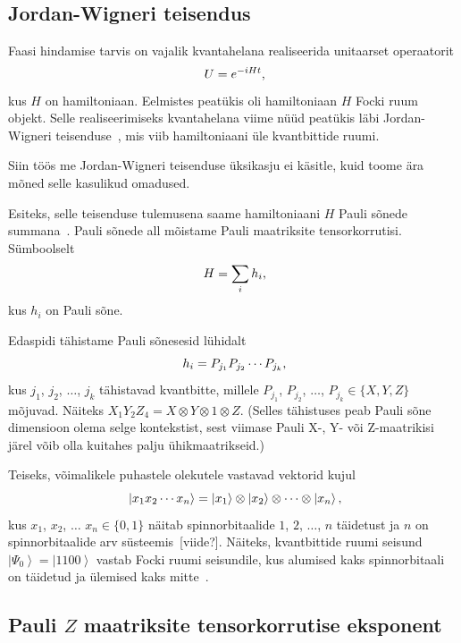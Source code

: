 \documentclass[12pt]{report}
\def\ket#1{\left|#1\right>}
\begin{document}
\subsection{Jordan-Wigneri teisendus}\label{sec:jw}

Faasi hindamise tarvis on vajalik kvantahelana realiseerida unitaarset operaatorit
\begin{equation}\label{eq:hamtime}
  U = e^{-iHt}\rlap{,}
\end{equation}
kus \(H\) on hamiltoniaan.
Eelmistes peatükis oli hamiltoniaan \(H\) Focki ruum objekt.
Selle realiseerimiseks kvantahelana viime nüüd peatükis läbi Jordan-Wigneri teisenduse~\cite{jordan+wigner}, mis viib hamiltoniaani üle kvantbittide ruumi.

Siin töös me Jordan-Wigneri teisenduse üksikasju ei käsitle, kuid toome ära mõned selle kasulikud omadused.

Esiteks, selle teisenduse tulemusena saame hamiltoniaani \(H\) Pauli sõnede summana~\cite{whitfield+etal}.
Pauli sõnede all mõistame Pauli maatriksite tensorkorrutisi.
Sümboolselt
\begin{equation}\label{eq:paulisum} H = \sum_i h_i\rlap{,} \end{equation}
kus $h_i$ on Pauli sõne.

Edaspidi tähistame Pauli sõnesesid lühidalt
\begin{equation} h_i=P_{j_1}P_{j_2}\cdots P_{j_k} \rlap{,}\end{equation}
kus \(j_1\), \(j_2\), $\ldots$, \(j_k\) tähistavad kvantbitte, millele \(P_{j_1}\), \(P_{j_2}\), \(\ldots\), \(P_{j_k}\in\{X,Y,Z\}\) mõjuvad.
Näiteks \(X_1Y_2Z_4=X\otimes Y\otimes 1\otimes Z.\)
(Selles tähistuses peab Pauli sõne dimensioon olema selge kontekstist, sest viimase Pauli X-, Y- või Z-maatrikisi järel võib olla kuitahes palju ühikmaatrikseid.)

Teiseks, võimalikele puhastele olekutele vastavad vektorid kujul
\begin{equation}
  \ket{x_1x_2\cdots x_n}
     = \ket{x_1}\otimes\ket{x_2}\otimes\cdots\otimes\ket{x_n}\rlap{,}
\end{equation}
kus $x_1$, $x_2$, $\ldots$ $x_n\in\{0,1\}$ näitab spinnorbitaalide $1$, $2$, $\ldots$, $n$ täidetust ja $n$ on spinnorbitaalide arv süsteemis~[viide?].
Näiteks, kvantbittide ruumi seisund \(\ket{\Psi_0}=\ket{1100}\) vastab Focki ruumi seisundile, kus alumised kaks spinnorbitaali on täidetud ja ülemised kaks mitte~\cite{szabo+ostlund, mcardle+etal}.


\subsection{Pauli $Z$ maatriksite tensorkorrutise eksponent}
\end{document}
